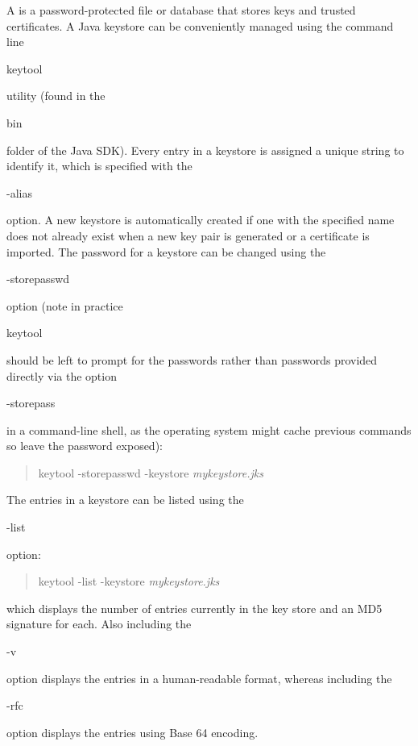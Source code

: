 A  is a password-protected file or database that stores keys
and trusted certificates.
A Java keystore can be conveniently managed using the command line \begin{code}keytool\end{code}
utility (found in the \begin{code}bin\end{code} folder of the Java SDK).
Every entry in a keystore is assigned a unique string 
to identify it, which is specified with the \begin{code}-alias\end{code} option.
A new keystore is automatically created if one with the specified name does not
already exist when a new key pair is generated or a certificate is imported.
The password for a keystore can be changed using the \begin{code}-storepasswd\end{code}
option
(note in practice \begin{code}keytool\end{code} should be left to
prompt for the passwords rather than passwords provided directly via the
option \begin{code}-storepass\end{code} in a command-line shell,
as the operating system might cache previous commands so leave the password
exposed):
\begin{quote}\begin{code}
keytool -storepasswd -keystore \emph{mykeystore.jks}
\end{code}\end{quote}
The entries in a keystore can be listed using the \begin{code}-list\end{code} option:
\begin{quote}\begin{code}
keytool -list -keystore \emph{mykeystore.jks}
\end{code}\end{quote}
which displays the number of entries currently in the key store and an MD5 signature
for each.
Also including the \begin{code}-v\end{code} option displays the entries in
a human-readable format, whereas including the \begin{code}-rfc\end{code} option
displays the entries using Base 64 encoding.

